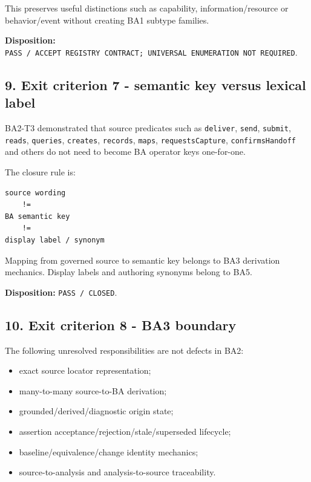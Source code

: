 \documentclass[11pt,a4paper]{article}
\providecommand{\tightlist}{\setlength{\itemsep}{0pt}\setlength{\parskip}{0pt}}
\begin{document}
This preserves useful distinctions such as capability, information/resource or behavior/event without creating BA1 subtype families.

\textbf{Disposition:} \texttt{PASS\ /\ ACCEPT\ REGISTRY\ CONTRACT;\ UNIVERSAL\ ENUMERATION\ NOT\ REQUIRED}.

\subsection{9. Exit criterion 7 - semantic key versus lexical label}\label{exit-criterion-7---semantic-key-versus-lexical-label}

BA2-T3 demonstrated that source predicates such as \texttt{deliver}, \texttt{send}, \texttt{submit}, \texttt{reads}, \texttt{queries}, \texttt{creates}, \texttt{records}, \texttt{maps}, \texttt{requestsCapture}, \texttt{confirmsHandoff} and others do not need to become BA operator keys one-for-one.

The closure rule is:

\begin{verbatim}
source wording
    !=
BA semantic key
    !=
display label / synonym
\end{verbatim}

Mapping from governed source to semantic key belongs to BA3 derivation mechanics. Display labels and authoring synonyms belong to BA5.

\textbf{Disposition:} \texttt{PASS\ /\ CLOSED}.

\subsection{10. Exit criterion 8 - BA3 boundary}\label{exit-criterion-8---ba3-boundary}

The following unresolved responsibilities are not defects in BA2:

\begin{itemize}
\tightlist
\item
  exact source locator representation;
\item
  many-to-many source-to-BA derivation;
\item
  grounded/derived/diagnostic origin state;
\item
  assertion acceptance/rejection/stale/superseded lifecycle;
\item
  baseline/equivalence/change identity mechanics;
\item
  source-to-analysis and analysis-to-source traceability.
\end{itemize}
\end{document}
